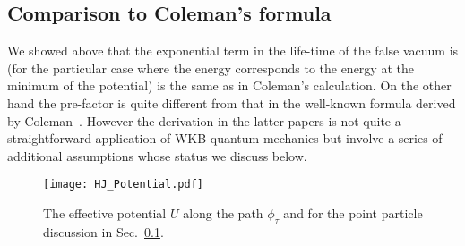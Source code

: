 \documentclass[a4paper,11pt]{article}
\numberwithin{equation}{section}
\begin{document}
\subsection{Comparison to Coleman's formula}
\label{sec:ScalarFieldComparison}

We showed above that the exponential term in the life-time of the false vacuum is (for the particular case where the energy corresponds to the energy at the minimum of the potential) is the same as in Coleman's calculation. On the other hand the pre-factor  is quite different from that in  the well-known formula derived by Coleman~\cite{Coleman:1977py, Callan:1977pt}. However the derivation in the latter papers is not quite a straightforward application of WKB quantum mechanics but involve a series of additional assumptions whose status we discuss below. 
\begin{figure}[h!] 
\begin{center} 
\texttt{[image: HJ\_Potential.pdf]}
\caption{The effective potential $U$ along the path $\phi_{\tau}$ and  for the point particle discussion in Sec.~\ref{sec:ScalarFieldComparison}.\label{fig:BouncePotential}}
\end{center} 
\end{figure}
\end{document}
